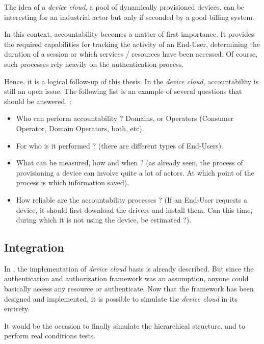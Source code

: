 The idea of a \emph{device cloud}, a pool of dynamically provisioned devices, can be interesting for an industrial actor but only if seconded by a good billing system. 

	In this context, accountability becomes a matter of first importance. It provides the required capabilities for tracking the activity of an End-User, determining the duration of a session or which services / resources have been accessed. Of course, such processes rely heavily on the authentication process.

Hence, it is a logical follow-up of this thesis. In the \emph{device cloud}, accountability is still an open issue. The following list is an example of several questions that should be answered, : 
\begin{itemize}
	\item Who can perform accountability ? Domains, or Operators (Consumer Operator, Domain Operators, both, etc).
	\item For who is it performed ? (there are different types of End-Users).
	\item What can be measured, how and when ? (as already seen, the process of provisioning a device can involve quite a lot of actors. At which point of the process is which information saved). 
	\item How reliable are the accountability processes ?  (If an End-User requests a device, it should first download the drivers and install them. Can this time, during which it is not using the device, 	be estimated ?).
\end{itemize}


\subsection*{Integration}
\addtocounter{subsection}{1}
In , the implementation of \emph{device cloud} basis is already described. But since the authentication and authorization framework was an assumption, anyone could basically access any resource or authenticate. Now that the framework has been designed and implemented, it is possible to simulate the \emph{device cloud} in its entirety. 

It would be the occasion to finally simulate the hierarchical structure, and to perform real conditions tests.


